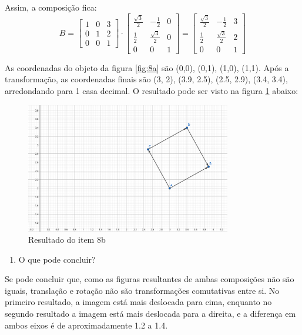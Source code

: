 \documentclass[12pt]{article}
\begin{document}
Assim, a composição fica:
\begin{equation*}
    \renewcommand\arraystretch{2}
    B = 
    \begin{bmatrix}
    1 & 0 & 3 \\
    0 & 1 & 2 \\
    0 & 0 & 1
    \end{bmatrix}
    \cdot
    \begin{bmatrix}
    \frac{\sqrt{3}}{2} & -\frac{1}{2} & 0 \\
    \frac{1}{2} & \frac{\sqrt{3}}{2} & 0 \\
    0 & 0 & 1
    \end{bmatrix}
    =
    \begin{bmatrix}
    \frac{\sqrt{3}}{2} & -\frac{1}{2} & 3 \\
    \frac{1}{2} & \frac{\sqrt{3}}{2} & 2 \\
    0 & 0 & 1
    \end{bmatrix}
\end{equation*}

As coordenadas do objeto da figura \ref{fig:8a} são (0,0), (0,1), (1,0), (1,1). Após a transformação, as coordenadas finais são (3, 2), (3.9, 2.5), (2.5, 2.9), (3.4, 3.4), arredondando para 1 casa decimal. O resultado pode ser visto na figura \ref{fig:8b_resp} abaixo:

\begin{figure}[H]
    \centering
    \includegraphics[width=0.8\textwidth]{images/8b_resp.png}
    \caption{Resultado do item 8b}
    \label{fig:8b_resp}
\end{figure}

\begin{enumerate}[label=\alph*), resume]
    \item O que pode concluir?
\end{enumerate}

Se pode concluir que, como as figuras resultantes de ambas composições não são iguais, translação e rotação não são transformações comutativas entre si. No primeiro resultado, a imagem está mais deslocada para cima, enquanto no segundo resultado a imagem está mais deslocada para a direita, e a diferença em ambos eixos é de aproximadamente 1.2 a 1.4.
\end{document}
